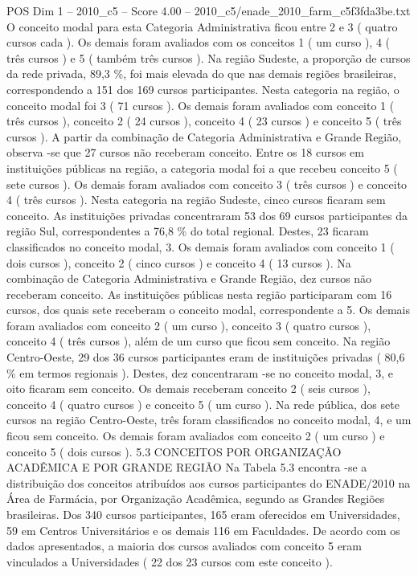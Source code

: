\begin{textsample}{POS Dim 1 – 2010\_c5 – Score 4.00 – 2010\_c5/enade\_2010\_farm\_c5f3fda3be.txt}
O conceito modal para esta Categoria Administrativa ficou entre 2 e 3 ( quatro cursos cada ).
Os demais foram avaliados com os conceitos 1 ( um curso ), 4 ( três cursos ) e 5 ( também três cursos ).
Na região Sudeste, a proporção de cursos da rede privada, 89,3 \%, foi mais elevada do que nas demais regiões brasileiras, correspondendo a 151 dos 169 cursos participantes.
Nesta categoria na região, o conceito modal foi 3 ( 71 cursos ).
Os demais foram avaliados com conceito 1 ( três cursos ), conceito 2 ( 24 cursos ), conceito 4 ( 23 cursos ) e conceito 5 ( três cursos ).
A partir da combinação de Categoria Administrativa e Grande Região, observa -se que 27 cursos não receberam conceito.
Entre os 18 cursos em instituições públicas na região, a categoria modal foi a que recebeu conceito 5 ( sete cursos ).
Os demais foram avaliados com conceito 3 ( três cursos ) e conceito 4 ( três cursos ).
Nesta categoria na região Sudeste, cinco cursos ficaram sem conceito.
As instituições privadas concentraram 53 dos 69 cursos participantes da região Sul, correspondentes a 76,8 \% do total regional.
Destes, 23 ficaram classificados no conceito modal, 3.
Os demais foram avaliados com conceito 1 ( dois cursos ), conceito 2 ( cinco cursos ) e conceito 4 ( 13 cursos ).
Na combinação de Categoria Administrativa e Grande Região, dez cursos não receberam conceito.
As instituições públicas nesta região participaram com 16 cursos, dos quais sete receberam o conceito modal, correspondente a 5.
Os demais foram avaliados com conceito 2 ( um curso ), conceito 3 ( quatro cursos ), conceito 4 ( três cursos ), além de um curso que ficou sem conceito.
Na região Centro-Oeste, 29 dos 36 cursos participantes eram de instituições privadas ( 80,6 \% em termos regionais ).
Destes, dez concentraram -se no conceito modal, 3, e oito ficaram sem conceito.
Os demais receberam conceito 2 ( seis cursos ), conceito 4 ( quatro cursos ) e conceito 5 ( um curso ).
Na rede pública, dos sete cursos na região Centro-Oeste, três foram classificados no conceito modal, 4, e um ficou sem conceito.
Os demais foram avaliados com conceito 2 ( um curso ) e conceito 5 ( dois cursos ). 5.3 CONCEITOS POR ORGANIZAÇÃO ACADÊMICA E POR GRANDE REGIÃO Na Tabela 5.3 encontra -se a distribuição dos conceitos atribuídos aos cursos participantes do ENADE/2010 na Área de Farmácia, por Organização Acadêmica, segundo as Grandes Regiões brasileiras.
Dos 340 cursos participantes, 165 eram oferecidos em Universidades, 59 em Centros Universitários e os demais 116 em Faculdades.
De acordo com os dados apresentados, a maioria dos cursos avaliados com conceito 5 eram vinculados a Universidades ( 22 dos 23 cursos com este conceito ).

\end{textsample}
